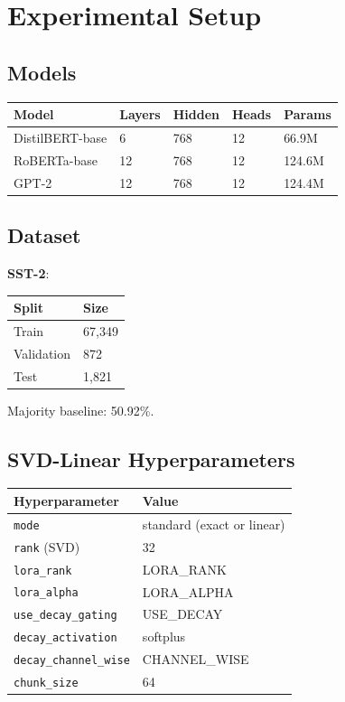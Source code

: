 
\section{Experimental Setup}

\subsection{Models}

\begin{table}[H]
\centering
\small
\begin{tabular}{lllll}
\toprule
\textbf{Model} & \textbf{Layers} & \textbf{Hidden} & \textbf{Heads} & \textbf{Params} \\
\midrule
DistilBERT-base & 6 & 768 & 12 & 66.9M \\
RoBERTa-base & 12 & 768 & 12 & 124.6M \\
GPT-2 & 12 & 768 & 12 & 124.4M \\
\bottomrule
\end{tabular}
\end{table}

\subsection{Dataset}

\textbf{SST-2}:

\begin{table}[H]
\centering
\small
\begin{tabular}{ll}
\toprule
\textbf{Split} & \textbf{Size} \\
\midrule
Train & 67,349 \\
Validation & 872 \\
Test & 1,821 \\
\bottomrule
\end{tabular}
\end{table}

Majority baseline: 50.92\%.

\subsection{SVD-Linear Hyperparameters}

\begin{table}[H]
\centering
\small
\begin{tabular}{ll}
\toprule
\textbf{Hyperparameter} & \textbf{Value} \\
\midrule
\texttt{mode} & standard (exact or linear) \\
\texttt{rank} (SVD) & 32 \\
\texttt{lora\_rank} & {{LORA\_RANK}} \\
\texttt{lora\_alpha} & {{LORA\_ALPHA}} \\
\texttt{use\_decay\_gating} & {{USE\_DECAY}} \\
\texttt{decay\_activation} & softplus \\
\texttt{decay\_channel\_wise} & {{CHANNEL\_WISE}} \\
\texttt{chunk\_size} & 64 \\
\bottomrule
\end{tabular}
\end{table}

